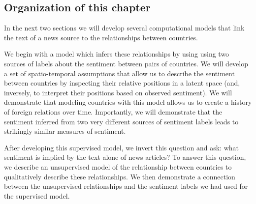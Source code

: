 \subsection*{Organization of this chapter}

In the next two sections we will develop several computational models that
link the text of a news source to the relationships between countries.

We begin with a model which infers these relationships by using using
two sources of labels about the sentiment between pairs of countries.
We will develop a set of spatio-temporal assumptions that allow us to
describe the sentiment between countries by inspecting their relative
positions in a latent space (and, inversely, to interpret their
positions based on observed sentiment).  We will demonstrate that
modeling countries with this model allows us to create a history of
foreign relations over time.  Importantly, we will demonstrate that
the sentiment inferred from two very different sources of sentiment
labels leads to strikingly similar measures of sentiment.

After developing this supervised model, we invert this question and ask:
what sentiment is implied by the text alone of news articles?  To
answer this question, we describe an unsupervised model of the
relationship between countries to qualitatively describe these
relationships.  We then demonstrate a connection between the
unsupervised relationships and the sentiment labels we had used for
the supervised model.
